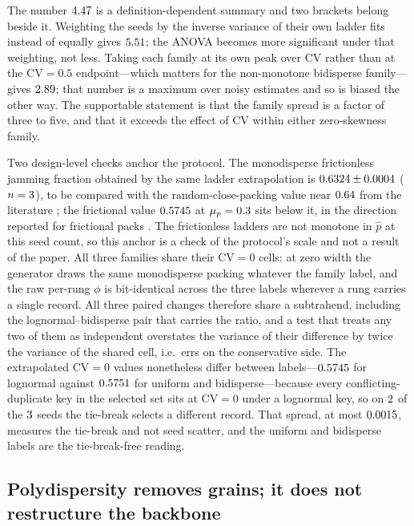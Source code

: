 \documentclass[reprint,aps,pre,amsmath,amssymb,superscriptaddress,longbibliography,nofootinbib,floatfix]{revtex4-2}
\newcommand{\pHat}{\hat{p}}
\newcommand{\mup}{\mu_{p}}
\newcommand{\CV}{\mathrm{CV}}
\begin{document}
The number $4.47$ is a definition-dependent summary and two brackets belong beside it.
Weighting the seeds by the inverse variance of their own ladder fits instead of equally gives $5.51$; the ANOVA becomes more significant under that weighting, not less.
Taking each family at its own peak over $\CV$ rather than at the $\CV=0.5$ endpoint---which matters for the non-monotone bidisperse family---gives $2.89$; that number is a maximum over noisy estimates and so is biased the other way.
The supportable statement is that the family spread is a factor of three to five, and that it exceeds the effect of $\CV$ within either zero-skewness family.

Two design-level checks anchor the protocol.
The monodisperse frictionless jamming fraction obtained by the same ladder extrapolation is $0.6324\pm0.0004$ ($n=3$), to be compared with the random-close-packing value near $0.64$ from the literature \cite{ohern2003jamming,silbert2010jamming}; the frictional value $0.5745$ at $\mup=\muP$ sits below it, in the direction reported for frictional packs \cite{silbert2010jamming}.
The frictionless ladders are not monotone in $\pHat$ at this seed count, so this anchor is a check of the protocol's scale and not a result of the paper.
All three families share their $\CV=0$ cells: at zero width the generator draws the same monodisperse packing whatever the family label, and the raw per-rung $\phi$ is bit-identical across the three labels wherever a rung carries a single record.
All three paired changes therefore share a subtrahend, including the lognormal--bidisperse pair that carries the ratio, and a test that treats any two of them as independent overstates the variance of their difference by twice the variance of the shared cell, i.e.\ errs on the conservative side.
The extrapolated $\CV=0$ values nonetheless differ between labels---$0.5745$ for lognormal against $0.5751$ for uniform and bidisperse---because every conflicting-duplicate key in the selected set sits at $\CV=0$ under a lognormal key, so on $2$ of the $3$ seeds the tie-break selects a different record.
That spread, at most $0.0015$, measures the tie-break and not seed scatter, and the uniform and bidisperse labels are the tie-break-free reading.

\subsection{Polydispersity removes grains; it does not restructure the backbone}
\label{sec:fabric}
\end{document}
